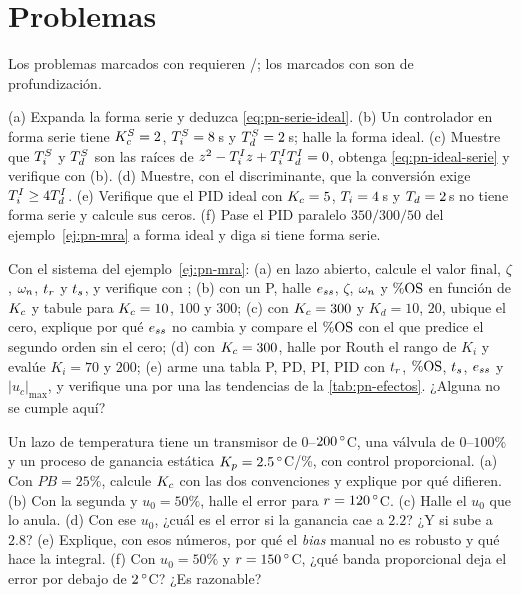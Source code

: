 \section{Problemas}
\label{sec:pn-problemas}

Los problemas marcados con \etiquetaM{} requieren \matlab/\simulink; los marcados con \etiquetaEstrella{} son de profundización.

\begin{problema}\label{prob:pn-formas}
(a) Expanda la forma serie y deduzca \eqref{eq:pn-serie-ideal}. (b) Un controlador en forma serie tiene $K_c^S=2$, $T_i^S=8$\,s y $T_d^S=2$\,s; halle la forma ideal. (c) Muestre que $T_i^S$ y $T_d^S$ son las raíces de $z^2-T_i^Iz+T_i^IT_d^I=0$, obtenga \eqref{eq:pn-ideal-serie} y verifique con (b). (d) Muestre, con el discriminante, que la conversión exige $T_i^I\ge4T_d^I$. (e) Verifique que el PID ideal con $K_c=5$, $T_i=4$\,s y $T_d=2$\,s no tiene forma serie y calcule sus ceros. (f) Pase el PID paralelo $350/300/50$ del ejemplo~\ref{ej:pn-mra} a forma ideal y diga si tiene forma serie.
\end{problema}

\begin{problema}\label{prob:pn-mra}
Con el sistema del ejemplo~\ref{ej:pn-mra}: (a) en lazo abierto, calcule el valor final, $\zeta$, $\omega_n$, $t_r$ y $t_s$, y verifique con ; (b) con un P, halle $e_{ss}$, $\zeta$, $\omega_n$ y $\%\mathrm{OS}$ en función de $K_c$ y tabule para $K_c=10$, $100$ y $300$; (c) con $K_c=300$ y $K_d=10$, $20$, ubique el cero, explique por qué $e_{ss}$ no cambia y compare el $\%\mathrm{OS}$ con el que predice el segundo orden sin el cero; (d) con $K_c=300$, halle por Routh el rango de $K_i$ y evalúe $K_i=70$ y $200$; (e) \etiquetaM{} arme una tabla P, PD, PI, PID con $t_r$, $\%\mathrm{OS}$, $t_s$, $e_{ss}$ y $|u_c|_{\max}$, y verifique una por una las tendencias de la \cref{tab:pn-efectos}. ¿Alguna no se cumple aquí?
\end{problema}

\begin{problema}\label{prob:pn-banda}
Un lazo de temperatura tiene un transmisor de $0$--$200\,^{\circ}$C, una válvula de $0$--$100\%$ y un proceso de ganancia estática $K_p=2.5\,^{\circ}$C/\%, con control proporcional. (a) Con $PB=25\%$, calcule $K_c$ con las dos convenciones y explique por qué difieren. (b) Con la segunda y $u_0=50\%$, halle el error para $r=120\,^{\circ}$C. (c) Halle el $u_0$ que lo anula. (d) Con ese $u_0$, ¿cuál es el error si la ganancia cae a $2.2$? ¿Y si sube a $2.8$? (e) Explique, con esos números, por qué el \emph{bias} manual no es robusto y qué hace la integral. (f) Con $u_0=50\%$ y $r=150\,^{\circ}$C, ¿qué banda proporcional deja el error por debajo de $2\,^{\circ}$C? ¿Es razonable?
\end{problema}

